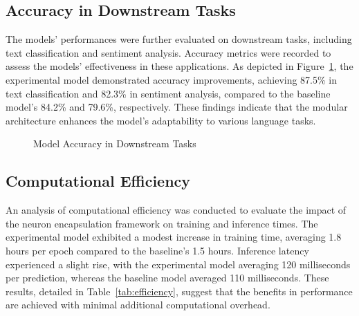 \documentclass{article}
\begin{document}
\subsection{Accuracy in Downstream Tasks}

The models' performances were further evaluated on downstream tasks, including text classification and sentiment analysis. Accuracy metrics were recorded to assess the models' effectiveness in these applications. As depicted in Figure~\ref{fig:accuracy}, the experimental model demonstrated accuracy improvements, achieving 87.5\% in text classification and 82.3\% in sentiment analysis, compared to the baseline model's 84.2\% and 79.6\%, respectively. These findings indicate that the modular architecture enhances the model's adaptability to various language tasks.

\begin{figure}[h]
	\centering
	\caption{Model Accuracy in Downstream Tasks}
	\label{fig:accuracy}
\end{figure}

\subsection{Computational Efficiency}

An analysis of computational efficiency was conducted to evaluate the impact of the neuron encapsulation framework on training and inference times. The experimental model exhibited a modest increase in training time, averaging 1.8 hours per epoch compared to the baseline's 1.5 hours. Inference latency experienced a slight rise, with the experimental model averaging 120 milliseconds per prediction, whereas the baseline model averaged 110 milliseconds. These results, detailed in Table~\ref{tab:efficiency}, suggest that the benefits in performance are achieved with minimal additional computational overhead.
\end{document}
